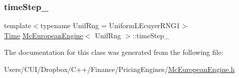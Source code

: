 \subsubsection{\texorpdfstring{time\+Step\+\_\+}{timeStep\_}}
{\footnotesize\ttfamily template$<$typename Unif\+Rng  = Uniform\+L\+Ecuyer\+R\+N\+G1$>$ \\
\hyperlink{_name_def_8h_ac2d3e0ba793497bcca555c7c2cf64ff3}{Time} \hyperlink{class_mc_european_engine}{Mc\+European\+Engine}$<$ Unif\+Rng $>$\+::time\+Step\+\_\+\hspace{0.3cm}{\ttfamily [private]}}



The documentation for this class was generated from the following file\+:\begin{DoxyCompactItemize}
\item 
Users/\+C\+U\+I/\+Dropbox/\+C++/\+Finance/\+Pricing\+Engines/\hyperlink{_mc_european_engine_8h}{Mc\+European\+Engine.\+h}\end{DoxyCompactItemize}
